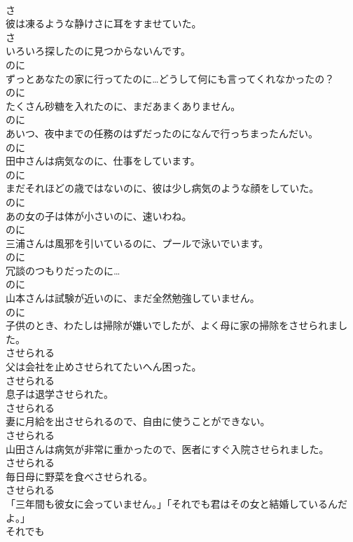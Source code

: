 \documentclass[8pt]{extreport}
\begin{document}
\begin{CJK}{UTF8}{min}
\\	さ
\\	彼は凍るような静けさに耳をすませていた。	
\\	さ
\\	いろいろ探したのに見つからないんです。	
\\	のに
\\	ずっとあなたの家に行ってたのに…どうして何にも言ってくれなかったの？	
\\	のに
\\	たくさん砂糖を入れたのに、まだあまくありません。	
\\	のに
\\	あいつ、夜中までの任務のはずだったのになんで行っちまったんだい。	
\\	のに
\\	田中さんは病気なのに、仕事をしています。	
\\	のに
\\	まだそれほどの歳ではないのに、彼は少し病気のような顔をしていた。	
\\	のに
\\	あの女の子は体が小さいのに、速いわね。	
\\	のに
\\	三浦さんは風邪を引いているのに、プールで泳いでいます。	
\\	のに
\\	冗談のつもりだったのに…	
\\	のに
\\	山本さんは試験が近いのに、まだ全然勉強していません。	
\\	のに
\\	子供のとき、わたしは掃除が嫌いでしたが、よく母に家の掃除をさせられました。	
\\	させられる
\\	父は会社を止めさせられてたいへん困った。	
\\	させられる
\\	息子は退学させられた。	
\\	させられる
\\	妻に月給を出させられるので、自由に使うことができない。	
\\	させられる
\\	山田さんは病気が非常に重かったので、医者にすぐ入院させられました。	
\\	させられる
\\	毎日母に野菜を食べさせられる。	
\\	させられる
\\	「三年間も彼女に会っていません。」「それでも君はその女と結婚しているんだよ。」	
\\	それでも

\end{CJK}
\end{document}
